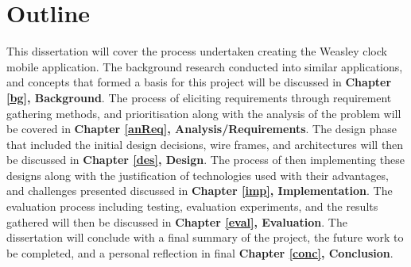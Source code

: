 \section{Outline}

This dissertation will cover the process undertaken creating the Weasley clock mobile application. The background research conducted into similar applications, and concepts that formed a basis for this project will be discussed in \textbf{Chapter \ref{bg}, Background}. The process of eliciting requirements through requirement gathering methods, and prioritisation along with the analysis of the problem will be covered in \textbf{Chapter \ref{anReq}, Analysis/Requirements}. The design phase that included the initial design decisions, wire frames, and architectures will then be discussed in \textbf{Chapter \ref{des}, Design}. The process of then implementing these designs along with the justification of technologies used with their advantages, and challenges presented discussed in \textbf{Chapter \ref{imp}, Implementation}. The evaluation process including testing, evaluation experiments, and the results gathered will then be discussed in \textbf{Chapter \ref{eval}, Evaluation}. The dissertation will conclude with a final summary of the project, the future work to be completed, and a personal reflection in final \textbf{Chapter \ref{conc}, Conclusion}.